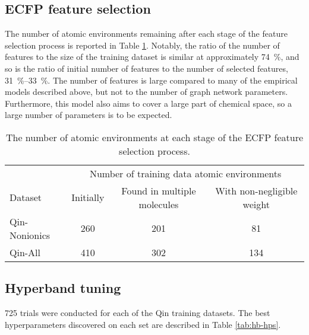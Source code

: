 \subsection{ECFP feature selection}

The number of atomic environments remaining after each stage of the feature
selection process is reported in Table \ref{tab:ecfp-fs}. Notably, the ratio of
the number of features to the size of the training dataset is similar at
approximately \SI{74}{\%}, and so is the ratio of initial number of features to
the number of selected features, \SIrange{31}{33}{\%}. The number of features is
large compared to many of the empirical models described above, but not to the
number of graph network parameters. Furthermore, this model also aims to cover a
large part of chemical space, so a large number of parameters is to be expected.

\begin{table}
    \centering
    \caption{The number of atomic environments at each stage of the ECFP feature selection process.}
    \label{tab:ecfp-fs}
    \begin{tabular}{@{}lccc@{}} \toprule
                      & \multicolumn{3}{c}{Number of training data atomic environments}                                                            \\\cmidrule(l){2-4}
        Dataset       & Initially                                                       & Found in multiple molecules & With non-negligible weight \\\midrule
        Qin-Nonionics & 260                                                             & 201                         & 81                         \\
        Qin-All       & 410                                                             & 302                         & 134                        \\\bottomrule
    \end{tabular}
\end{table}

\subsection{Hyperband tuning}

\num{725} trials were conducted for each of the Qin training datasets. The best
hyperparameters discovered on each set are described in Table \ref{tab:hb-hps}.

